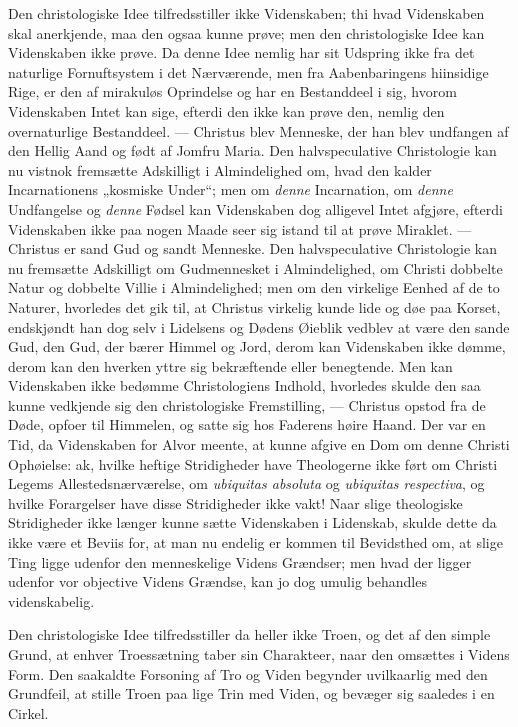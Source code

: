 \documentclass[12pt,a4paper]{book}
\newcommand{\opage}[1]{\marginnote{\footnotesize\textit{[#1]}}}
\begin{document}
Den christologiske Idee tilfredsstiller ikke Videnskaben; thi hvad
Videnskaben skal anerkjende, maa den ogsaa kunne prøve; men den
christologiske Idee kan Videnskaben ikke prøve. Da denne Idee nemlig har
sit Udspring ikke fra det naturlige Fornuftsystem i det Nærværende, men fra
Aabenbaringens hiinsidige Rige, er den af mirakuløs Oprindelse og har en
Bestanddeel i sig, hvorom Videnskaben Intet kan sige, efterdi den ikke kan
prøve den, nemlig den overnaturlige Bestanddeel. --- Christus blev
Menneske, der han blev undfangen af den Hellig Aand og født
\opage{101} af Jomfru Maria. Den halvspeculative Christologie kan nu vistnok fremsætte
Adskilligt i Almindelighed om, hvad den kalder Incarnationens „kosmiske
Under“; men om \emph{denne} Incarnation, om \emph{denne} Undfangelse og
\emph{denne} Fødsel kan Videnskaben dog alligevel Intet afgjøre, efterdi
Videnskaben ikke paa nogen Maade seer sig istand til at prøve Miraklet.
--- Christus er sand Gud og sandt Menneske. Den halvspeculative
Christologie kan nu fremsætte Adskilligt om Gudmennesket i Almindelighed,
om Christi dobbelte Natur og dobbelte Villie i Almindelighed; men om den
virkelige Eenhed af de to Naturer, hvorledes det gik til, at Christus
virkelig kunde lide og døe paa Korset, endskjøndt han dog selv i Lidelsens
og Dødens Øieblik vedblev at være den sande Gud, den Gud, der bærer Himmel
og Jord, derom kan Videnskaben ikke dømme, derom kan den hverken yttre sig
bekræftende eller benegtende. Men kan Videnskaben ikke bedømme
Christologiens Indhold, hvorledes skulde den saa kunne vedkjende sig den
christologiske Fremstilling, --- Christus opstod fra de Døde, opfoer til
Himmelen, og satte sig hos Faderens høire Haand. Der var en Tid, da
Videnskaben for Alvor meente, at kunne afgive en Dom om denne Christi
Ophøielse: ak, hvilke heftige Stridigheder have Theologerne ikke ført om
Christi Legems Allestedsnærværelse, om \textit{ubiquitas absoluta} og
\textit{ubiquitas respectiva}, og hvilke Forargelser have disse
Stridigheder ikke vakt! Naar slige theologiske Stridigheder ikke længer
kunne sætte Videnskaben i Lidenskab, skulde dette da ikke være et Beviis
for, at man nu endelig er kommen til Bevidsthed om, at slige Ting ligge
udenfor den menneskelige Videns Grændser; men hvad der ligger udenfor vor
objective Videns Grændse, kan jo dog umulig behandles videnskabelig.

Den christologiske Idee tilfredsstiller da heller ikke Troen, og det af den
simple Grund, at enhver Troessætning taber sin Charakteer, naar den
omsættes i Videns Form. Den saakaldte
\opage{102} Forsoning af Tro og Viden begynder uvilkaarlig med den Grundfeil, at stille
Troen paa lige Trin med Viden, og bevæger sig saaledes i en Cirkel.
\end{document}
